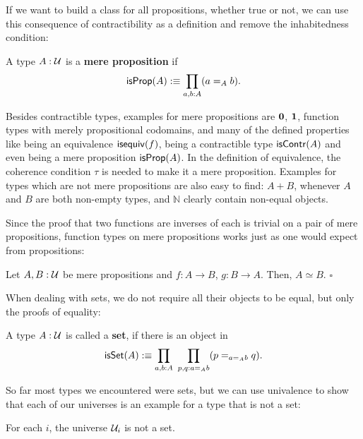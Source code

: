 If we want to build a class for all propositions, whether true or not, we can use
this consequence of contractibility as a definition and remove the inhabitedness
condition:
\begin{defn}
A type $A : \mathcal{U}$ is a \textbf{mere proposition} if
\begin{equation*}
\mathsf{isProp}(A) :\equiv \prod_{a, b : A} (a =_A b) \text{.}
\end{equation*}
\end{defn}

Besides contractible types, examples for mere propositions are $\mathbf{0}$, 
$\mathbf{1}$, function types with merely propositional codomains, and many of the
defined properties like being an equivalence $\mathsf{isequiv}(f)$, being a contractible
type $\mathsf{isContr}(A)$ and even being a mere proposition $\mathsf{isProp}(A)$.
In the definition of equivalence, the coherence condition $\tau$ is needed
to make it a mere proposition.
Examples for types which are not mere propositions are also easy to find:
$A + B$, whenever $A$ and $B$ are both non-empty types, and $\mathbb{N}$ clearly
contain non-equal objects.

Since the proof that two functions are inverses of each is trivial on a pair of
mere propositions, function types on mere propositions works just as one would
expect from propositions:
\begin{lemma}
Let $A, B : \mathcal{U}$ be mere propositions and $f : A \to B$, $g : B \to A$.
Then, $A \simeq B$. \hfill $\square$
\end{lemma}

When dealing with sets, we do not require all their objects to be equal, but
only the proofs of equality:
\begin{defn}[Sets]
A type $A : \mathcal{U}$ is called a \textbf{set}, if there is an object in
\begin{equation*}
\mathsf{isSet}(A) :\equiv \prod_{a, b : A} ~ \prod_{p, q : a =_A b} (p =_{a =_A b} q) \text{.}
\end{equation*}
\end{defn}

So far most types we encountered were sets, but we can use univalence to show
that each of our universes is an example for a type that is not a set:
\begin{lemma}
For each $i$, the universe $\mathcal{U}_i$ is not a set.
\end{lemma}

